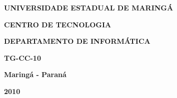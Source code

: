 
\vspace{4cm}

\begin{center}

\textbf{UNIVERSIDADE ESTADUAL DE MARINGÁ}

\textbf{CENTRO DE TECNOLOGIA}

\textbf{DEPARTAMENTO DE INFORMÁTICA}

\vspace{4cm}

\textbf{\MakeUppercase{\doctitulo}}

\vspace{1cm}

\MakeUppercase{\docautor}

\vspace{1cm}

\textbf{TG-CC-10}

\end{center}

\vspace{11cm}

\begin{center}
\centering
\textbf{Maringá - Paraná}

\textbf{2010}
\end{center}


\pagebreak
